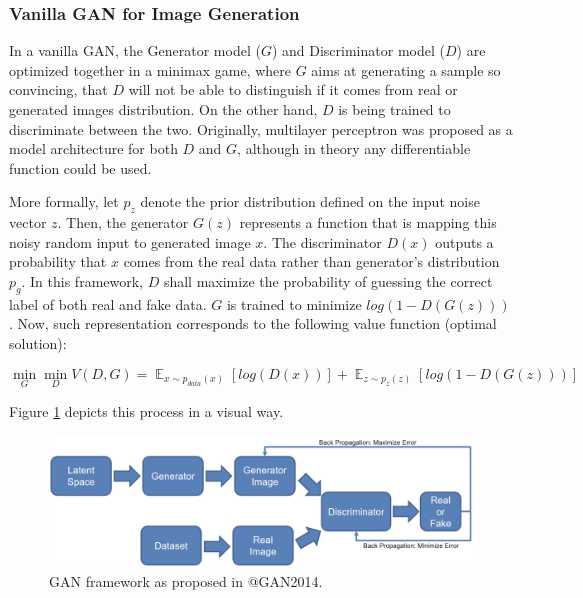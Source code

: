 \documentclass[
]{krantz}
\renewenvironment{quote}{\begin{VF}}{\end{VF}}
\begin{document}
\hypertarget{vanilla-gan-for-image-generation}{%
\subsubsection{Vanilla GAN for Image Generation}\label{vanilla-gan-for-image-generation}}

In a vanilla GAN, the Generator model (\(G\)) and Discriminator model (\(D\)) are optimized together in a minimax game, where \(G\) aims at generating a sample so convincing, that \(D\) will not be able to distinguish if it comes from real or generated images distribution. On the other hand, \(D\) is being trained to discriminate between the two. Originally, multilayer perceptron was proposed as a model architecture for both \(D\) and \(G\), although in theory any differentiable function could be used.

More formally, let \(p_{z}\) denote the prior distribution defined on the input noise vector \(z\). Then, the generator \(G(z)\) represents a function that is mapping this noisy random input to generated image \(x\). The discriminator \(D(x)\) outputs a probability that \(x\) comes from the real data rather than generator's distribution \(p_{g}\). In this framework, \(D\) shall maximize the probability of guessing the correct label of both real and fake data. \(G\) is trained to minimize \(log(1-D(G(z)))\). Now, such representation corresponds to the following value function (optimal solution):

\begin{quote}
\[\min_{G}\min_{D}V(D,G) = \mathop{{}\mathbb{E}}_{x \sim p_{data}(x)} [log(D(x))] + \mathop{{}\mathbb{E}}_{z \sim p_{z}(z)} [log(1-D(G(z)))]\]
\end{quote}

Figure \ref{fig:vanillagan} depicts this process in a visual way.

\begin{figure}

{\centering \includegraphics[width=0.8\linewidth]{figures/02-02-text-2-img/vanillagan} 

}

\caption{GAN framework as proposed in @GAN2014.}\label{fig:vanillagan}
\end{figure}
\end{document}
